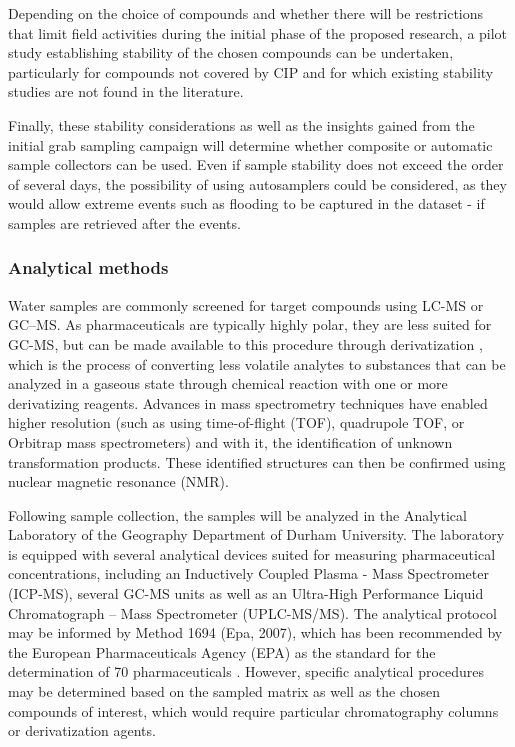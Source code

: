 \documentclass{article}
\begin{document}
Depending on the choice of compounds and whether there will be restrictions that limit field activities during the initial phase of the proposed research, a pilot study establishing stability of the chosen compounds can be undertaken, particularly for compounds not covered by CIP and for which existing stability studies are not found in the literature.

Finally, these stability considerations as well as the insights gained from the initial grab sampling campaign will determine whether composite or automatic sample collectors can be used. Even if sample stability does not exceed the order of several days, the possibility of using autosamplers could be considered, as they would allow extreme events such as flooding to be captured in the dataset - if samples are retrieved after the events. 

\subsubsection{Analytical methods}
Water samples are commonly screened for target compounds using LC-MS or GC–MS. As pharmaceuticals are typically highly polar, they are less suited for GC-MS, but can be made available to this procedure through derivatization \citep{Postigo2014TransformationTreatment}, which is the process of converting less volatile analytes to substances that can be analyzed in a gaseous state through chemical reaction with one or more derivatizing reagents. Advances in mass spectrometry techniques have enabled higher resolution (such as using time-of-flight (TOF), quadrupole TOF, or Orbitrap mass spectrometers) and with it, the identification of unknown transformation products. These identified structures can then be confirmed using nuclear magnetic resonance (NMR). 

Following sample collection, the samples will be analyzed in the Analytical Laboratory of the Geography Department of Durham University. The laboratory is equipped with several analytical devices suited for measuring pharmaceutical concentrations, including an Inductively Coupled Plasma - Mass Spectrometer (ICP-MS), several GC-MS units as well as an Ultra-High Performance Liquid Chromatograph – Mass Spectrometer (UPLC-MS/MS). The analytical protocol may be informed by Method 1694 (Epa, 2007), which has been recommended by the European Pharmaceuticals Agency (EPA) as the standard for the determination of 70 pharmaceuticals \citep{Caban2015AnalyticalProspects}. However, specific analytical procedures may be determined based on the sampled matrix as well as the chosen compounds of interest, which would require particular chromatography columns or derivatization agents.
\end{document}
